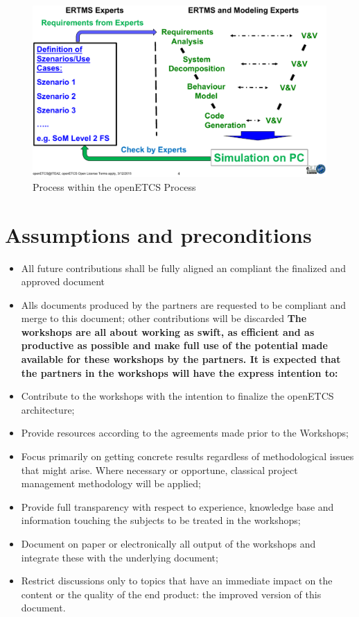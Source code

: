 \begin{figure}[h]
\includegraphics[scale=0.5]{images/Procedure.png}
\caption{Process within the openETCS Process}
\label{Process within the openETCS Process}
\end{figure}

\section{Assumptions and preconditions}
\begin{itemize}
\item All future contributions shall be fully aligned an compliant the finalized and approved document 
\item Alls documents produced by the partners are requested to be compliant and merge to this document; other contributions will be discarded
\textbf{The workshops are all about working as swift, as efficient and as productive as possible and make full use of the potential made available for these workshops by the partners. It is expected that the partners in the workshops will have the express intention to:}
\item Contribute to the workshops with the intention to finalize the openETCS architecture;\\
\item Provide resources according to the agreements made prior to the Workshops;\\
\item Focus primarily on  getting concrete results regardless of methodological issues that might arise. Where necessary or opportune, classical project management methodology will be applied;\\
\item Provide full transparency with respect to experience, knowledge base and information touching the subjects to be treated in the workshops;\\
\item Document on paper or electronically all output of the workshops and integrate these with the underlying document;\\
\item Restrict discussions only to topics that have an immediate impact on the content or the quality of the end product: the improved version of this document.\\
\end{itemize}

